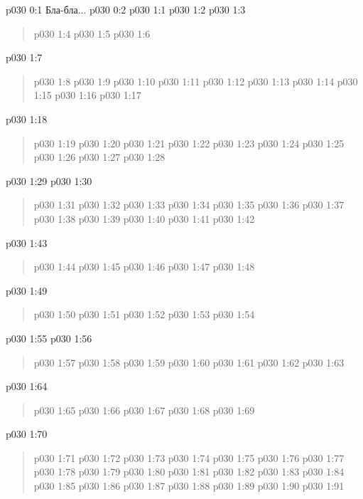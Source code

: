 \author{Могущественный Посланник}
\vs p030 0:1  Бла-бла...
\vs p030 0:2 
\vs p030 1:1 
\vsetspace
\vs p030 1:2 
\vsetspace
\vs p030 1:3 
\begin{quote}
\vs p030 1:4 
\vs p030 1:5 
\vs p030 1:6 
\end{quote}
\vsetspace
\vs p030 1:7 
\begin{quote}
\vs p030 1:8 
\vs p030 1:9 
\vs p030 1:10 
\vs p030 1:11 
\vs p030 1:12 
\vs p030 1:13 
\vs p030 1:14 
\vs p030 1:15 
\vs p030 1:16 
\vs p030 1:17 
\end{quote}
\vsetspace
\vs p030 1:18 
\begin{quote}
\vs p030 1:19 
\vs p030 1:20 
\vs p030 1:21 
\vs p030 1:22 
\vs p030 1:23 
\vs p030 1:24 
\vs p030 1:25 
\vs p030 1:26 
\vs p030 1:27 
\vs p030 1:28 
\end{quote}
\vsetspace
\vs p030 1:29 
\vsetspace
\vs p030 1:30 
\begin{quote}
\vs p030 1:31 
\vs p030 1:32 
\vs p030 1:33 
\vs p030 1:34 
\vs p030 1:35 
\vs p030 1:36 
\vs p030 1:37 
\vs p030 1:38 
\vs p030 1:39 
\vs p030 1:40 
\vs p030 1:41 
\vs p030 1:42 
\end{quote}
\vsetspace
\vs p030 1:43 
\begin{quote}
\vs p030 1:44 
\vs p030 1:45 
\vs p030 1:46 
\vs p030 1:47 
\vs p030 1:48 
\end{quote}
\vsetspace
\vs p030 1:49 
\begin{quote}
\vs p030 1:50 
\vs p030 1:51 
\vs p030 1:52 
\vs p030 1:53 
\vs p030 1:54 
\end{quote}
\vsetspace
\vs p030 1:55 
\vsetspace
\vs p030 1:56 
\begin{quote}
\vs p030 1:57 
\vs p030 1:58 
\vs p030 1:59 
\vs p030 1:60 
\vs p030 1:61 
\vs p030 1:62 
\vs p030 1:63 
\end{quote}
\vsetspace
\vs p030 1:64 
\begin{quote}
\vs p030 1:65 
\vs p030 1:66 
\vs p030 1:67 
\vs p030 1:68 
\vs p030 1:69 
\end{quote}
\vsetspace
\vs p030 1:70 
\begin{quote}
\vs p030 1:71 
\vs p030 1:72 
\vs p030 1:73 
\vs p030 1:74 
\vs p030 1:75 
\vs p030 1:76 
\vs p030 1:77 
\vs p030 1:78 
\vs p030 1:79 
\vs p030 1:80 
\vs p030 1:81 
\vs p030 1:82 
\vs p030 1:83 
\vs p030 1:84 
\vs p030 1:85 
\vs p030 1:86 
\vs p030 1:87 
\vs p030 1:88 
\vs p030 1:89 
\vs p030 1:90 
\vs p030 1:91 
\end{quote}
